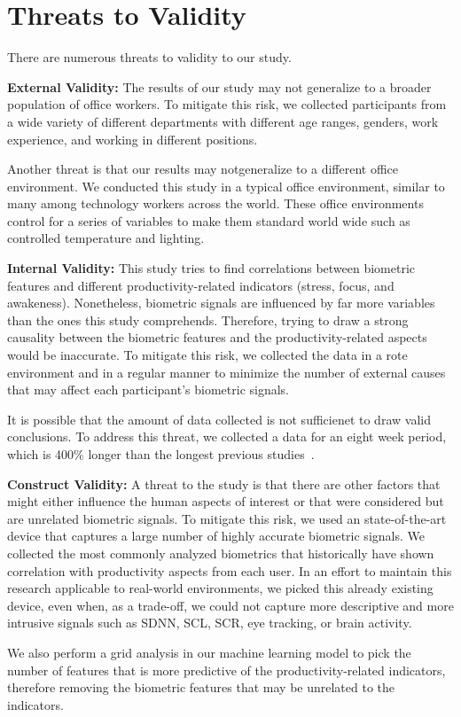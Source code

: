 \section{Threats to Validity}

There are numerous threats to validity to our study.

\textbf{External Validity:}
The results of our study may 
 not generalize to a broader population of office workers.
To mitigate this risk, we collected participants
from a wide variety of different departments
with different age ranges, genders, work experience, and 
working in different positions.

Another threat is that our results may notgeneralize
to a different office environment. We  conducted
this study in a typical office environment,  similar to many
among technology workers across the world.
These office environments control for a series of
variables to make them standard world wide such
as controlled temperature and lighting.

\textbf{Internal Validity:}
This study tries to find correlations between
biometric features and different productivity-related indicators (stress, focus, and awakeness).
Nonetheless, biometric signals are influenced by far more
variables than the ones this study comprehends.
Therefore, trying to draw a strong causality between the biometric
features and the productivity-related aspects would be inaccurate.
To mitigate this risk,  we collected the data
in a rote environment and in a regular manner 
to minimize the number of 
external causes that may affect each participant's
biometric signals.

It is possible that the amount of data collected
is not sufficienet
to draw valid conclusions. To address this threat, 
we collected a data for an eight week period, which is
400\% longer than the longest previous studies~\cite{zuger18,Muller16}.

\textbf{Construct Validity:}
A threat to the study is that
there are other factors that might either influence the
human aspects of interest or that were considered but
are unrelated biometric signals.
To mitigate this risk, we used an state-of-the-art
device that captures a large number of highly accurate biometric
signals. We collected the most commonly analyzed
biometrics that historically have shown correlation with 
productivity aspects from each user.
In an effort to maintain this research applicable to real-world environments, we picked this already existing device, even when, as a trade-off, we could not capture more descriptive and more intrusive signals such as SDNN, SCL, SCR, eye tracking, or brain activity.

We also perform a grid analysis in our machine learning model
to pick the number of features that is more predictive
of the productivity-related indicators, 
therefore removing the biometric
features that may be unrelated to the indicators.











